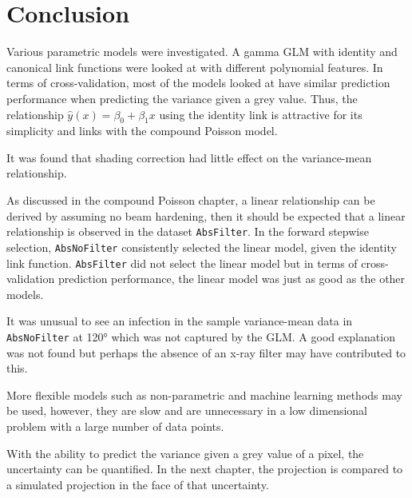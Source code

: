 \section{Conclusion}

Various parametric models were investigated. A gamma GLM with identity and canonical link functions were looked at with different polynomial features. In terms of cross-validation, most of the models looked at have similar prediction performance when predicting the variance given a grey value. Thus, the relationship $\widehat{y}(x)=\beta_0+\beta_1 x$ using the identity link is attractive for its simplicity and links with the compound Poisson model.

It was found that shading correction had little effect on the variance-mean relationship.

As discussed in the compound Poisson chapter, a linear relationship can be derived by assuming no beam hardening, then it should be expected that a linear relationship is observed in the dataset \texttt{AbsFilter}. In the forward stepwise selection, \texttt{AbsNoFilter} consistently selected the linear model, given the identity link function. \texttt{AbsFilter} did not select the linear model but in terms of cross-validation prediction performance, the linear model was just as good as the other models.

It was unusual to see an infection in the sample variance-mean data in \texttt{AbsNoFilter} at \ang{120} which was not captured by the GLM. A good explanation was not found but perhaps the absence of an x-ray filter may have contributed to this.

More flexible models such as non-parametric and machine learning methods may be used, however, they are slow and are unnecessary in a low dimensional problem with a large number of data points.

With the ability to predict the variance given a grey value of a pixel, the uncertainty can be quantified. In the next chapter, the projection is compared to a simulated projection in the face of that uncertainty.